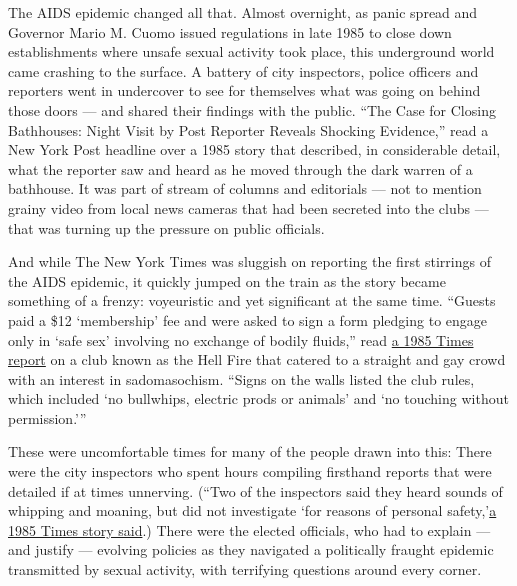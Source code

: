 The AIDS epidemic changed all that. Almost overnight, as panic spread
and Governor Mario M. Cuomo issued regulations in late 1985 to close
down establishments where unsafe sexual activity took place, this
underground world came crashing to the surface. A battery of city
inspectors, police officers and reporters went in undercover to see for
themselves what was going on behind those doors --- and shared their
findings with the public. ``The Case for Closing Bathhouses: Night Visit
by Post Reporter Reveals Shocking Evidence,'' read a New York Post
headline over a 1985 story that described, in considerable detail, what
the reporter saw and heard as he moved through the dark warren of a
bathhouse. It was part of stream of columns and editorials --- not to
mention grainy video from local news cameras that had been secreted into
the clubs --- that was turning up the pressure on public officials.

And while The New York Times was sluggish on reporting the first
stirrings of the AIDS epidemic, it quickly jumped on the train as the
story became something of a frenzy: voyeuristic and yet significant at
the same time. ``Guests paid a \$12 `membership' fee and were asked to
sign a form pledging to engage only in `safe sex' involving no exchange
of bodily fluids,'' read
\href{https://www.nytimes3xbfgragh.onion/1985/11/09/nyregion/at-homosexual-establishments-a-new-climate-of-caution.html}{a
1985 Times report} on a club known as the Hell Fire that catered to a
straight and gay crowd with an interest in sadomasochism. ``Signs on the
walls listed the club rules, which included `no bullwhips, electric
prods or animals' and `no touching without permission.'''

These were uncomfortable times for many of the people drawn into this:
There were the city inspectors who spent hours compiling firsthand
reports that were detailed if at times unnerving. (``Two of the
inspectors said they heard sounds of whipping and moaning, but did not
investigate `for reasons of personal
safety,'\href{https://www.nytimes3xbfgragh.onion/1985/11/08/nyregion/city-closes-bar-frequented-by-homosexuals-citing-sexual-activity-linked-to-aids.html}{a
1985 Times story said}.) There were the elected officials, who had to
explain --- and justify --- evolving policies as they navigated a
politically fraught epidemic transmitted by sexual activity, with
terrifying questions around every corner.

